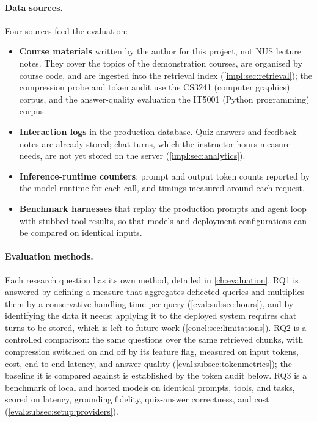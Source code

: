 \paragraph{Data sources.} Four sources feed the evaluation:
\begin{itemize}[nosep]
  \item \textbf{Course materials} written by the author for this project,
        not NUS lecture notes. They cover the topics of the demonstration
        courses, are organised by course code, and are ingested into the
        retrieval index (\autoref{impl:sec:retrieval}); the compression probe
        and token audit use the CS3241 (computer graphics) corpus, and the
        answer-quality evaluation the IT5001 (Python programming) corpus.
  \item \textbf{Interaction logs} in the production database. Quiz answers
        and feedback notes are already stored; chat turns, which the
        instructor-hours measure needs, are not yet stored on the server
        (\autoref{impl:sec:analytics}).
  \item \textbf{Inference-runtime counters}: prompt and output token counts
        reported by the model runtime for each call, and timings measured
        around each request.
  \item \textbf{Benchmark harnesses} that replay the production prompts and
        agent loop with stubbed tool results, so that models and deployment
        configurations can be compared on identical inputs.
\end{itemize}

\paragraph{Evaluation methods.} Each research question has its own method,
detailed in \autoref{ch:evaluation}. RQ1 is answered by defining a measure that
aggregates deflected queries and multiplies them by a conservative handling
time per query (\autoref{eval:subsec:hours}), and by identifying the data it
needs; applying it to the deployed system requires chat turns to be stored,
which is left to future work (\autoref{concl:sec:limitations}). RQ2 is a controlled comparison: the same
questions over the same retrieved chunks, with compression switched on and
off by its feature flag, measured on input tokens, cost, end-to-end latency,
and answer quality (\autoref{eval:subsec:tokenmetrics}); the baseline it is
compared against is established by the token audit below. RQ3 is a benchmark
of local and hosted models on identical prompts, tools, and tasks, scored on
latency, grounding fidelity, quiz-answer correctness, and cost
(\autoref{eval:subsec:setup:providers}).

